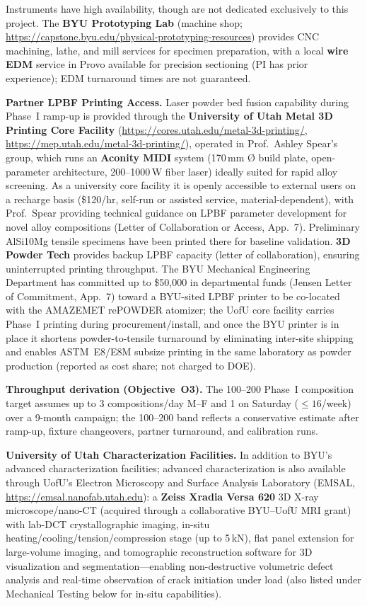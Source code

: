 \documentclass[11pt,letterpaper]{article}
\begin{document}
Instruments have high availability, though are not dedicated
exclusively to this project.
The \textbf{BYU Prototyping Lab} (machine shop;
\url{https://capstone.byu.edu/physical-prototyping-resources}) provides CNC
machining, lathe, and mill services for specimen preparation, with a local
\textbf{wire EDM} service in Provo available for precision sectioning (PI has
prior experience); EDM turnaround times are not guaranteed.

\textbf{Partner LPBF Printing Access.}
Laser powder bed fusion capability during Phase~I ramp-up is provided through
the \textbf{University of Utah Metal 3D Printing Core Facility}
(\url{https://cores.utah.edu/metal-3d-printing/},
\url{https://mep.utah.edu/metal-3d-printing/}), operated in Prof.\ Ashley
Spear's group, which runs an \textbf{Aconity MIDI} system (170\,mm
\textsf{\O} build plate, open-parameter architecture, 200--1000\,W fiber
laser) ideally suited for rapid alloy screening.  As a university core
facility it is openly accessible to external users on a recharge basis
(\$120/hr, self-run or assisted service, material-dependent), with Prof.\
Spear providing technical guidance on LPBF parameter development for novel
alloy compositions (Letter of Collaboration or Access, App.~7).  Preliminary
AlSi10Mg tensile specimens have been printed there for baseline validation.
\textbf{3D Powder Tech} provides backup LPBF capacity (letter of collaboration),
ensuring uninterrupted printing throughput.
The BYU Mechanical Engineering Department has committed up to \$50{,}000 in
departmental funds (Jensen Letter of Commitment, App.~7) toward a BYU-sited
LPBF printer to be co-located with the AMAZEMET rePOWDER atomizer; the UofU
core facility carries Phase~I printing during procurement/install, and once
the BYU printer is in place it shortens powder-to-tensile turnaround by
eliminating inter-site shipping and enables ASTM~E8/E8M subsize printing in
the same laboratory as powder production (reported as cost share; not
charged to DOE).

\textbf{Throughput derivation (Objective~O3).}
The 100--200 Phase~I composition target assumes up to 3 compositions/day
M--F and 1 on Saturday (${\leq}16$/week) over a 9-month campaign;
the 100--200 band reflects a conservative estimate
after ramp-up, fixture changeovers, partner turnaround, and
calibration runs.

\textbf{University of Utah Characterization Facilities.}
In addition to BYU's advanced characterization facilities; advanced characterization is also available through UofU's Electron Microscopy and
Surface Analysis Laboratory (EMSAL, \url{https://emsal.nanofab.utah.edu}):
a \textbf{Zeiss Xradia Versa 620} 3D X-ray microscope/nano-CT (acquired
through a collaborative BYU--UofU MRI grant) with lab-DCT
crystallographic imaging, in-situ heating/cooling/tension/compression
stage (up to 5\,kN), flat panel extension for large-volume imaging,
and tomographic reconstruction software for 3D visualization and
segmentation---enabling non-destructive volumetric defect analysis and
real-time observation of crack initiation under load
(also listed under Mechanical Testing below for in-situ capabilities).
\end{document}
